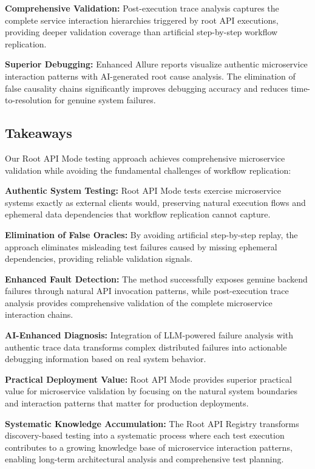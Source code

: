 \documentclass[conference]{IEEEtran}
\begin{document}
\textbf{Comprehensive Validation:} Post-execution trace analysis captures the complete service interaction hierarchies triggered by root API executions, providing deeper validation coverage than artificial step-by-step workflow replication.

\textbf{Superior Debugging:} Enhanced Allure reports visualize authentic microservice interaction patterns with AI-generated root cause analysis. The elimination of false causality chains significantly improves debugging accuracy and reduces time-to-resolution for genuine system failures.

\subsection{Takeaways}
Our Root API Mode testing approach achieves comprehensive microservice validation while avoiding the fundamental challenges of workflow replication:

\textbf{Authentic System Testing:} Root API Mode tests exercise microservice systems exactly as external clients would, preserving natural execution flows and ephemeral data dependencies that workflow replication cannot capture.

\textbf{Elimination of False Oracles:} By avoiding artificial step-by-step replay, the approach eliminates misleading test failures caused by missing ephemeral dependencies, providing reliable validation signals.

\textbf{Enhanced Fault Detection:} The method successfully exposes genuine backend failures through natural API invocation patterns, while post-execution trace analysis provides comprehensive validation of the complete microservice interaction chains.

\textbf{AI-Enhanced Diagnosis:} Integration of LLM-powered failure analysis with authentic trace data transforms complex distributed failures into actionable debugging information based on real system behavior.

\textbf{Practical Deployment Value:} Root API Mode provides superior practical value for microservice validation by focusing on the natural system boundaries and interaction patterns that matter for production deployments.

\textbf{Systematic Knowledge Accumulation:} The Root API Registry transforms discovery-based testing into a systematic process where each test execution contributes to a growing knowledge base of microservice interaction patterns, enabling long-term architectural analysis and comprehensive test planning.



\end{document}
